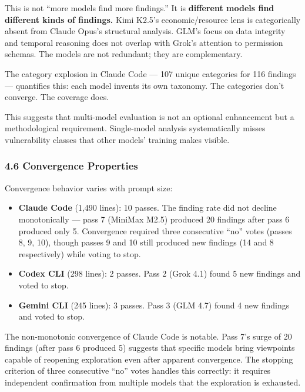 \documentclass[
]{article}
\providecommand{\tightlist}{%
  \setlength{\itemsep}{0pt}\setlength{\parskip}{0pt}}
\begin{document}
This is not ``more models find more findings.'' It is \textbf{different
models find different kinds of findings.} Kimi K2.5's economic/resource
lens is categorically absent from Claude Opus's structural analysis.
GLM's focus on data integrity and temporal reasoning does not overlap
with Grok's attention to permission schemas. The models are not
redundant; they are complementary.

The category explosion in Claude Code --- 107 unique categories for 116
findings --- quantifies this: each model invents its own taxonomy. The
categories don't converge. The coverage does.

This suggests that multi-model evaluation is not an optional enhancement
but a methodological requirement. Single-model analysis systematically
misses vulnerability classes that other models' training makes visible.

\hypertarget{convergence-properties}{%
\subsubsection{4.6 Convergence
Properties}\label{convergence-properties}}

Convergence behavior varies with prompt size:

\begin{itemize}
\tightlist
\item
  \textbf{Claude Code} (1,490 lines): 10 passes. The finding rate did
  not decline monotonically --- pass 7 (MiniMax M2.5) produced 20
  findings after pass 6 produced only 5. Convergence required three
  consecutive ``no'' votes (passes 8, 9, 10), though passes 9 and 10
  still produced new findings (14 and 8 respectively) while voting to
  stop.
\item
  \textbf{Codex CLI} (298 lines): 2 passes. Pass 2 (Grok 4.1) found 5
  new findings and voted to stop.
\item
  \textbf{Gemini CLI} (245 lines): 3 passes. Pass 3 (GLM 4.7) found 4
  new findings and voted to stop.
\end{itemize}

The non-monotonic convergence of Claude Code is notable. Pass 7's surge
of 20 findings (after pass 6 produced 5) suggests that specific models
bring viewpoints capable of reopening exploration even after apparent
convergence. The stopping criterion of three consecutive ``no'' votes
handles this correctly: it requires independent confirmation from
multiple models that the exploration is exhausted.
\end{document}
